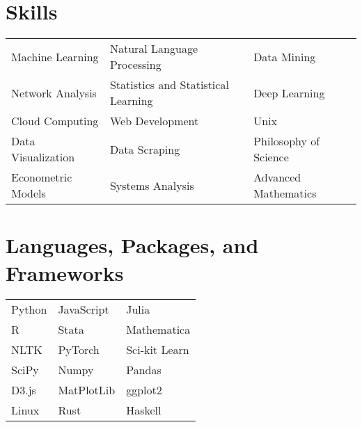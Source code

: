 \documentclass[10pt,a4paper,sans]{moderncv}
\begin{document}
\section{Skills}

\def\arraystretch{0}
\raggedleft
\begin{tabularx}{.9\textwidth}{>{\center\arraybackslash}X >{\center\arraybackslash}X >{\center\arraybackslash}X}
	Machine Learning & Natural Language Processing & Data Mining \\
	Network Analysis & Statistics and Statistical Learning & Deep Learning \\
	Cloud Computing & Web Development & Unix \\
	Data Visualization & Data Scraping & Philosophy of Science \\
	Econometric Models & Systems Analysis & Advanced Mathematics
\end{tabularx}

\section{Languages, Packages, and Frameworks}
\def\arraystretch{0}
\raggedleft
\begin{tabularx}{.9\textwidth}{>{\center\arraybackslash}X >{\center\arraybackslash}X >{\center\arraybackslash}X}
Python & JavaScript & Julia \\
R & Stata & Mathematica \\
NLTK & PyTorch & Sci-kit Learn \\
SciPy & Numpy & Pandas \\
D3.js & MatPlotLib & ggplot2 \\
Linux & Rust & Haskell \\

\end{tabularx}
\end{document}
